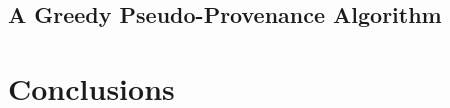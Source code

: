 \documentclass[final]{article}
\begin{document}
\subsection{A Greedy Pseudo-Provenance Algorithm}

\section{Conclusions}





\end{document}
